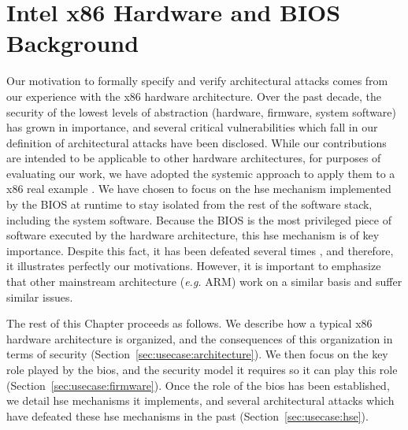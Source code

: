 \chapter{Intel x86 Hardware and BIOS Background}
\label{chapter:usecase}


\vspace{1cm}\noindent
%
Our motivation to formally specify and verify architectural attacks comes from
our experience with the x86 hardware architecture. 
%
Over the past decade, the security of the lowest levels of abstraction (hardware,
firmware, system software) has grown in importance, and several critical
vulnerabilities which fall in our definition of architectural attacks have been
disclosed.  
%
While our contributions are intended to be applicable to other hardware
architectures, for purposes of evaluating our work, we have adopted the systemic
approach to apply them to a x86 real example .
%
We have chosen to focus on the \ac{hse} mechanism implemented by the BIOS at
runtime to stay isolated from the rest of the software stack, including the
system software.
%
Because the BIOS is the most privileged piece of software executed by the
hardware architecture, this \ac{hse} mechanism is of key importance.
%
Despite this fact, it has been defeated several times , and therefore, it
illustrates perfectly our motivations.
%
However, it is important to emphasize that other mainstream architecture
(\emph{e.g.}  ARM) work on a similar basis and suffer similar issues.

The rest of this Chapter proceeds as follows.
%
We describe how a typical x86 hardware architecture is organized, and the
consequences of this organization in terms of security
(Section~\ref{sec:usecase:architecture}).
%
We then focus on the key role played by the \ac{bios}, and the security model it
requires so it can play this role (Section~\ref{sec:usecase:firmware}).
%
Once the role of the \ac{bios} has been established, we detail \ac{hse}
mechanisms it implements, and several architectural attacks which have defeated
these \ac{hse} mechanisms in the past (Section~\ref{sec:usecase:hse}).

